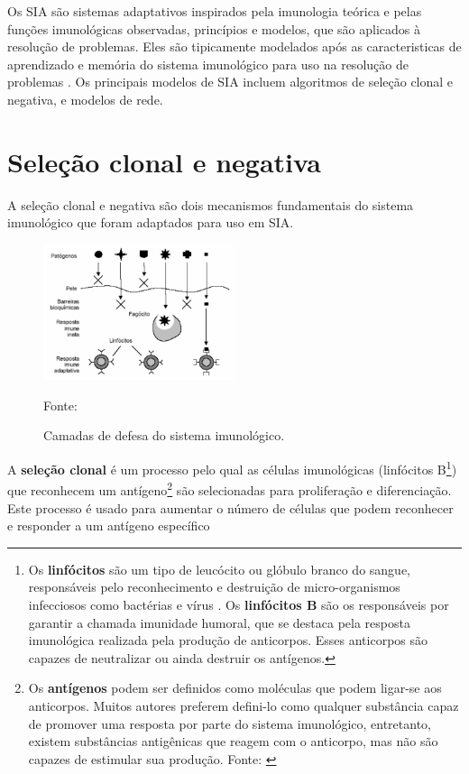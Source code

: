 Os SIA são sistemas adaptativos inspirados pela imunologia teórica e pelas funções imunológicas observadas, princípios e modelos, que são aplicados à resolução de problemas. Eles são tipicamente modelados após as caracteristicas de aprendizado e memória do sistema imunológico para uso na resolução de problemas \cite{boccato2024}. Os principais modelos de SIA incluem algoritmos de seleção clonal e negativa, e modelos de rede.

\section{Seleção clonal e negativa}
\thispagestyle{mystyle}

A seleção clonal e negativa são dois mecanismos fundamentais do sistema imunológico que foram adaptados para uso em SIA.

\begin{figure}[h]
\centering
\includegraphics[width=0.5\textwidth]{imgs/camadas_defesa_sistema_imunologico.png}
\caption{Camadas de defesa do sistema imunológico.}
\label{fig:selecao_clonal_negativa}
Fonte: \cite{castro1999}
\end{figure}

A \textbf{seleção clonal} é um processo pelo qual as células imunológicas (linfócitos B\footnote{Os \textbf{linfócitos} são um tipo de leucócito ou glóbulo branco do sangue, responsáveis pelo reconhecimento e destruição de micro-organismos infecciosos como bactérias e vírus \cite{todamateria2024}. Os \textbf{linfócitos B} são os responsáveis por garantir a chamada imunidade humoral, que se destaca pela resposta imunológica realizada pela produção de anticorpos. Esses anticorpos são capazes de neutralizar ou ainda destruir os antígenos\cite{santos2024linfocitos}. }) que reconhecem um antígeno\footnote{Os \textbf{antígenos} podem ser definidos como moléculas que podem ligar-se aos anticorpos. Muitos autores preferem defini-lo como qualquer substância capaz de promover uma resposta por parte do sistema imunológico, entretanto, existem substâncias antigênicas que reagem com o anticorpo, mas não são capazes de estimular sua produção. Fonte: \cite{santos2024antigenos}} são selecionadas para proliferação e diferenciação. Este processo é usado para aumentar o número de células que podem reconhecer e responder a um antígeno específico \cite{williams2024}


